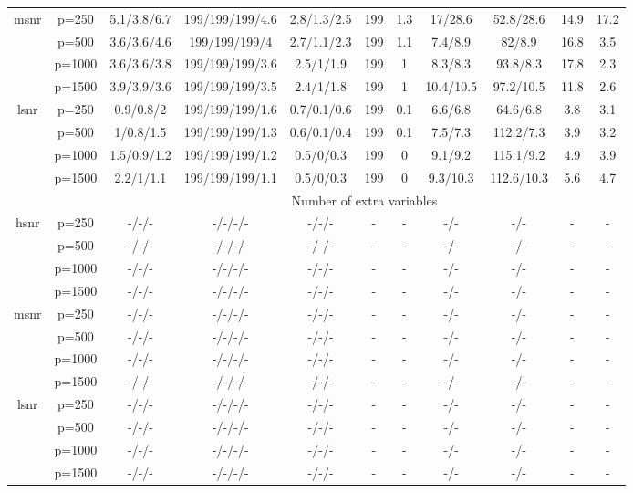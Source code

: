\begin{table}[ht]
{\begin{tabular}{|c|c|ccccccccc|}
  \midrule\multirow{4}[2]{*}{msnr} & p=250 & 5.1/3.8/6.7 & 199/199/199/4.6 & 2.8/1.3/2.5 & 199 & 1.3 & 17/28.6 & 52.8/28.6 & 14.9 & 17.2 \\ 
   & p=500 & 3.6/3.6/4.6 & 199/199/199/4 & 2.7/1.1/2.3 & 199 & 1.1 & 7.4/8.9 & 82/8.9 & 16.8 & 3.5 \\ 
   & p=1000 & 3.6/3.6/3.8 & 199/199/199/3.6 & 2.5/1/1.9 & 199 & 1 & 8.3/8.3 & 93.8/8.3 & 17.8 & 2.3 \\ 
   & p=1500 & 3.9/3.9/3.6 & 199/199/199/3.5 & 2.4/1/1.8 & 199 & 1 & 10.4/10.5 & 97.2/10.5 & 11.8 & 2.6 \\ 
  \midrule\multirow{4}[2]{*}{lsnr} & p=250 & 0.9/0.8/2 & 199/199/199/1.6 & 0.7/0.1/0.6 & 199 & 0.1 & 6.6/6.8 & 64.6/6.8 & 3.8 & 3.1 \\ 
   & p=500 & 1/0.8/1.5 & 199/199/199/1.3 & 0.6/0.1/0.4 & 199 & 0.1 & 7.5/7.3 & 112.2/7.3 & 3.9 & 3.2 \\ 
   & p=1000 & 1.5/0.9/1.2 & 199/199/199/1.2 & 0.5/0/0.3 & 199 & 0 & 9.1/9.2 & 115.1/9.2 & 4.9 & 3.9 \\ 
   & p=1500 & 2.2/1/1.1 & 199/199/199/1.1 & 0.5/0/0.3 & 199 & 0 & 9.3/10.3 & 112.6/10.3 & 5.6 & 4.7 \\ 
   \midrule 
 \multicolumn{1}{|c}{} &       & \multicolumn{9}{c|}{Number of extra variables} \\
\midrule\multirow{4}[2]{*}{hsnr} & p=250 & -/-/- & -/-/-/- & -/-/- & - & - & -/- & -/- & - & - \\ 
   & p=500 & -/-/- & -/-/-/- & -/-/- & - & - & -/- & -/- & - & - \\ 
   & p=1000 & -/-/- & -/-/-/- & -/-/- & - & - & -/- & -/- & - & - \\ 
   & p=1500 & -/-/- & -/-/-/- & -/-/- & - & - & -/- & -/- & - & - \\ 
  \midrule\multirow{4}[2]{*}{msnr} & p=250 & -/-/- & -/-/-/- & -/-/- & - & - & -/- & -/- & - & - \\ 
   & p=500 & -/-/- & -/-/-/- & -/-/- & - & - & -/- & -/- & - & - \\ 
   & p=1000 & -/-/- & -/-/-/- & -/-/- & - & - & -/- & -/- & - & - \\ 
   & p=1500 & -/-/- & -/-/-/- & -/-/- & - & - & -/- & -/- & - & - \\ 
  \midrule\multirow{4}[2]{*}{lsnr} & p=250 & -/-/- & -/-/-/- & -/-/- & - & - & -/- & -/- & - & - \\ 
   & p=500 & -/-/- & -/-/-/- & -/-/- & - & - & -/- & -/- & - & - \\ 
   & p=1000 & -/-/- & -/-/-/- & -/-/- & - & - & -/- & -/- & - & - \\ 
   & p=1500 & -/-/- & -/-/-/- & -/-/- & - & - & -/- & -/- & - & - \\ 
   \bottomrule 
\end{tabular}
}
\end{table}
